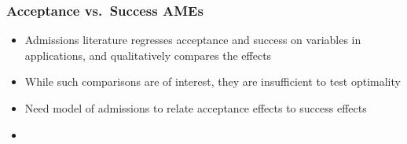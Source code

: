 \documentclass[12pt, aspectratio=169]{beamer}
\begin{document}
\begin{frame}[label=avsa]
\frametitle{Acceptance vs.\ Success AMEs}
\begin{minipage}[t]{0.45\textwidth}
\centering
\vspace{-75pt}
\end{minipage}%
\hfill
\begin{minipage}[c][0.8\textheight][c]{0.55\textwidth}
\begin{itemize}
\item Admissions literature regresses acceptance and success on variables in applications, and qualitatively compares the effects
\vspace{5pt}
\item While such comparisons are of interest, they are insufficient to test optimality
\vspace{5pt}
\item Need model of admissions to relate acceptance effects to success effects
\vspace{5pt}
\item[] \hyperlink{ioca}{}
\end{itemize}
\end{minipage}
\end{frame}

\end{document}
